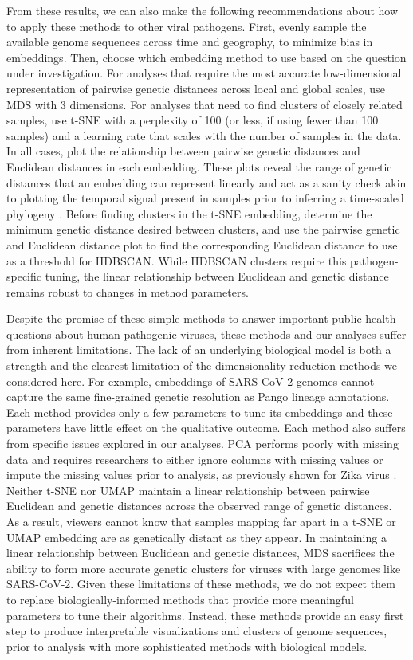 \documentclass[10pt,letterpaper]{article}
\begin{document}
From these results, we can also make the following recommendations about how to apply these methods to other viral pathogens.
First, evenly sample the available genome sequences across time and geography, to minimize bias in embeddings.
Then, choose which embedding method to use based on the question under investigation.
For analyses that require the most accurate low-dimensional representation of pairwise genetic distances across local and global scales, use MDS with 3 dimensions.
For analyses that need to find clusters of closely related samples, use t-SNE with a perplexity of 100 (or less, if using fewer than 100 samples) and a learning rate that scales with the number of samples in the data.
In all cases, plot the relationship between pairwise genetic distances and Euclidean distances in each embedding.
These plots reveal the range of genetic distances that an embedding can represent linearly and act as a sanity check akin to plotting the temporal signal present in samples prior to inferring a time-scaled phylogeny \cite{Rambaut2016,Sagulenko2018}.
Before finding clusters in the t-SNE embedding, determine the minimum genetic distance desired between clusters, and use the pairwise genetic and Euclidean distance plot to find the corresponding Euclidean distance to use as a threshold for HDBSCAN.
While HDBSCAN clusters require this pathogen-specific tuning, the linear relationship between Euclidean and genetic distance remains robust to changes in method parameters.

Despite the promise of these simple methods to answer important public health questions about human pathogenic viruses, these methods and our analyses suffer from inherent limitations.
The lack of an underlying biological model is both a strength and the clearest limitation of the dimensionality reduction methods we considered here.
For example, embeddings of SARS-CoV-2 genomes cannot capture the same fine-grained genetic resolution as Pango lineage annotations.
Each method provides only a few parameters to tune its embeddings and these parameters have little effect on the qualitative outcome.
Each method also suffers from specific issues explored in our analyses.
PCA performs poorly with missing data and requires researchers to either ignore columns with missing values or impute the missing values prior to analysis, as previously shown for Zika virus \cite{metsky_2017}.
Neither t-SNE nor UMAP maintain a linear relationship between pairwise Euclidean and genetic distances across the observed range of genetic distances.
As a result, viewers cannot know that samples mapping far apart in a t-SNE or UMAP embedding are as genetically distant as they appear.
In maintaining a linear relationship between Euclidean and genetic distances, MDS sacrifices the ability to form more accurate genetic clusters for viruses with large genomes like SARS-CoV-2.
Given these limitations of these methods, we do not expect them to replace biologically-informed methods that provide more meaningful parameters to tune their algorithms.
Instead, these methods provide an easy first step to produce interpretable visualizations and clusters of genome sequences, prior to analysis with more sophisticated methods with biological models.
\end{document}
